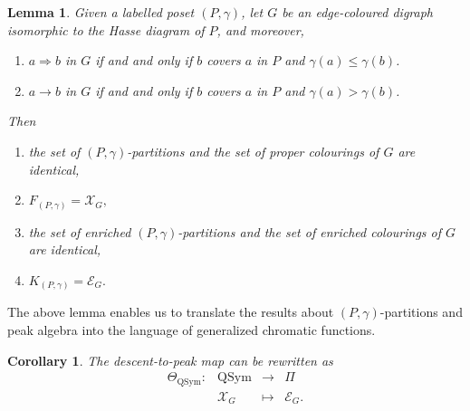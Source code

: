 \documentclass[11pt]{amsart}
\newtheorem{Corollary}[Theorem]{Corollary}
\newtheorem{Lemma}[Theorem]{Lemma}
\numberwithin{equation}{section}
\newcommand{\QSym}{\mathrm{QSym}}
\newcommand{\scrX}{{\mathscr{X}}}
\newcommand{\scrE}{{\mathscr{E}}}
\begin{document}
	\begin{Lemma}\label{lem:ppar-to-gcf}
	Given a labelled poset $(P,\gamma)$, let $G$  be an edge-coloured digraph isomorphic to the Hasse diagram of $P$, and moreover,
	 \begin{enumerate}
	\item $ a\Rightarrow  b$ in $G$ if and and only if $b$ covers $a$ in $P$ and $\gamma(a)\leq \gamma(b)$.
	\item $ a\rightarrow  b$ in $G$ if and and only if $b$ covers $a$ in $P$ and $\gamma(a)> \gamma(b)$.
	\end{enumerate} 
	Then
	\begin{enumerate} 
	 \item[(i)] the set of $(P,\gamma)$-partitions and the set of proper colourings of $G$ are identical, 
	 \item[(ii)] $F_{(P,\gamma)}=\scrX_G,$
	 \item[(iii)] the set of enriched $(P,\gamma)$-partitions and the set of enriched colourings of $G$ are identical,
	  \item[(iv)] $K_{(P,\gamma)}=\scrE_G.$
	\end{enumerate} 
	\end{Lemma} 
	
	The above lemma enables us to translate the results about $(P,\gamma)$-partitions and peak algebra into the language of generalized chromatic functions.

\begin{Corollary}\label{cor:theta-gcf1}
The {descent-to-peak} map can be rewritten as 
$$\begin{array}{cccc}
	\Theta_\QSym: & \QSym & \to & \Pi\\
	& \scrX_G & \mapsto & \scrE_G.
\end{array}$$



\end{Corollary}
\end{document}
